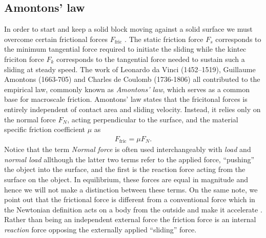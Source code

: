 \subsection{Amontons’ law}
 
 In order to start and keep a solid block moving against a solid surface we must
 overcome certain frictional forces $F_{\text{fric}}$ \cite{gnecco_meyer_2015}.
 The static friction force $F_s$ corresponds to the minimum tangential force
 required to initiate the sliding while the kintec friciton force $F_k$
 corresponds to the tangential force needed to sustain such a sliding at steady
 speed. The work of Leonardo da Vinci (1452–1519), Guillaume Amontons (1663-705)
 and Charles de Coulomb (1736-1806) all contributed to the empirical law,
 commonly known as \textit{Amontons’ law}, which serves as a common base for macroscale
 friction. Amontons’ law states that the fricitonal forces is entirely
 independent of contact area and sliding velocity. Instead, it relies only on
 the normal force $F_N$, acting perpendicular to the surface, and the material specific friction coefficient $\mu$ as
\begin{align}
  F_{\text{fric}} = \mu F_N.
  \label{eq:amonton}
\end{align}
Notice that the term \textit{Normal force} is often used interchangeably
with \textit{load} and \textit{normal load} allthough the latter two terms refer to the applied force, ``pushing'' the object into the surface, and the first is the reaction force acting from the surface on the object. In equilibrium, these forces are equal in magnitude and hence we will not make a distinction between these terms. On the same note, we point out that the frictional force is different from a conventional force which in the Newtonian definition acts on a body from the outside and make it accelerate \cite{gao_frictional_2004}. Rather than being an independent external force the friction force is an internal \textit{reaction} force opposing the externally applied ``sliding'' force. 


